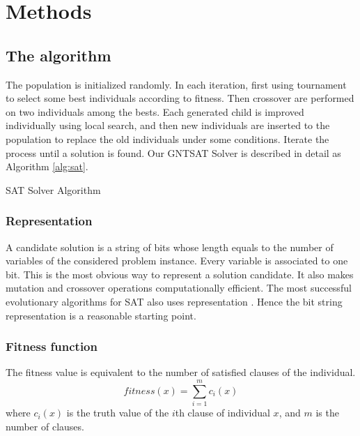 	\section{Methods}
	\subsection{The algorithm}
	The population is initialized randomly.  In each iteration, first using tournament to select some best individuals according to fitness.
	Then crossover are performed on two individuals among the bests. Each
	generated child is improved individually using local search, and then new individuals are inserted to the population to replace the old
	individuals under some conditions. Iterate the process until a solution is found.
	Our GNTSAT Solver is described in detail as Algorithm \ref{alg:sat}.
	\begin{algorithm}
	    \SetAlgoLined
	    \caption{SAT Solver Algorithm}
	    \label{alg:sat} 
	    \BlankLine
	  \end{algorithm}
	
	\subsubsection{Representation}
	A candidate solution is a string of bits whose length equals to the number of
	variables of the considered problem instance. Every variable is associated to
	one bit. This is the most obvious way to represent a solution candidate. It
	also makes mutation and crossover operations computationally efficient. The
	most successful evolutionary algorithms for SAT also uses representation
	\parencite{gottlieb_marchiori_rossi_2002}. Hence the bit string representation is a reasonable
	starting point.
	
	\subsubsection{Fitness function}
	The fitness value is equivalent to the number of satisfied clauses of the
	individual.
	\begin{equation*}
		\mathit{fitness}(x) = \sum_{i=1}^m c_i(x)
	\end{equation*}
	where $c_i(x)$ is the truth value of the $i$th
	clause of individual $x$, and $m$ is the number of clauses.
	
